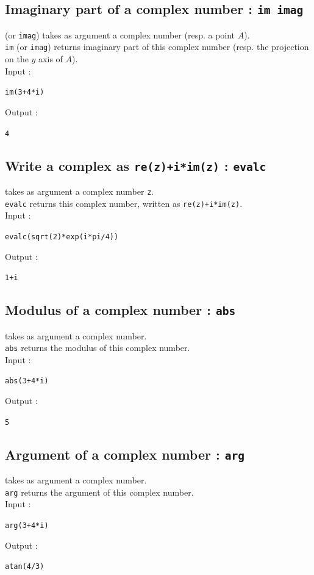 \documentclass[a4paper,11pt]{book}
\begin{document}
\subsection{Imaginary part of a complex number : {\tt im imag}}
 (or {\tt imag}) takes as argument a complex number (resp. a 
point $A$).\\
{\tt im} (or {\tt imag}) returns imaginary part  of this complex number (resp. 
the projection on the $y$ axis of $A$).\\
Input :
\begin{center}{\tt im(3+4*i)}\end{center}
Output :
\begin{center}{\tt 4}\end{center}

\subsection{Write a complex as {\tt re(z)+i*im(z)} : {\tt evalc}}
 takes as argument a complex number {\tt z}.\\
{\tt evalc} returns this complex number, written as
{\tt re(z)+i*im(z)}.\\
Input :
\begin{center}{\tt evalc(sqrt(2)*exp(i*pi/4))}\end{center}
Output :
\begin{center}{\tt 1+i}\end{center}

\subsection{Modulus of a complex number : {\tt abs}}
 takes as argument a complex number.\\
{\tt abs} returns the modulus of this complex number.\\
Input :
\begin{center}{\tt abs(3+4*i)}\end{center}
Output :
\begin{center}{\tt 5}\end{center}

\subsection{Argument of a complex number : {\tt arg}}
 takes as argument a complex number.\\
{\tt arg} returns the argument of this complex number.\\
Input :
\begin{center}{\tt arg(3+4*i)}\end{center}
Output :
\begin{center}{\tt atan(4/3)}\end{center}
\end{document}
